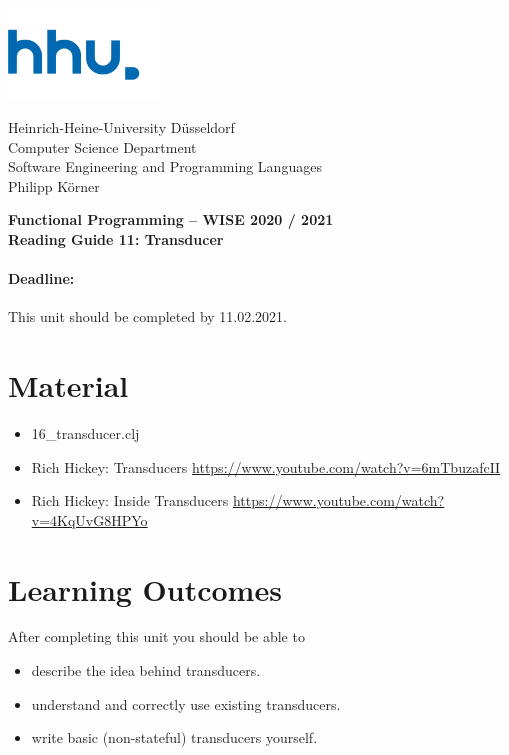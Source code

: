 \documentclass[11pt,a4paper]{article}
\begin{document}
\begin{minipage}[b]{\textwidth}
	\parbox[t]{5cm}{%
		\includegraphics[width=4cm]{unilogo}
		\hfill
	}
	\parbox[b]{11cm}{%
		Heinrich-Heine-University D\"usseldorf\\
		Computer Science Department\\
		Software Engineering and Programming Languages\\
		Philipp K\"orner
	}
\end{minipage}
\begin{center}
	\bf
	Functional Programming -- WISE 2020 / 2021\\
	Reading Guide 11: Transducer
\end{center}

\pagestyle{empty}

\paragraph{Deadline:} This unit should be completed by 11.02.2021.

\section{Material} 

\begin{itemize}
    \item 16\_transducer.clj
    \item Rich Hickey: Transducers \url{https://www.youtube.com/watch?v=6mTbuzafcII}
    \item Rich Hickey: Inside Transducers \url{https://www.youtube.com/watch?v=4KqUvG8HPYo}
\end{itemize}


\section{Learning Outcomes}

After completing this unit you should be able to

\begin{itemize}
    \item describe the idea behind transducers.
    \item understand and correctly use existing transducers.
    \item write basic (non-stateful) transducers yourself.
\end{itemize}
\end{document}
